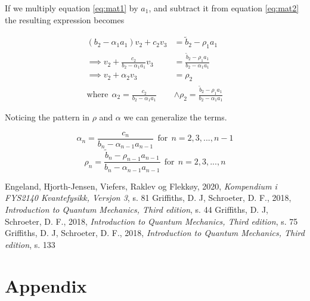 \documentclass[reprint, english,notitlepage]{revtex4-1}  %
\begin{document}
If we multiply equation \ref{eq:mat1} by $a_1$, and subtract it from equation \ref{eq:mat2} the resulting expression becomes

\begin{align*}
	(b_2 - \alpha_1 a_1) v_2 + c_2 v_3 &= \tilde{b}_2 - \rho_1 a_1 \\
	\implies v_2 + \frac{c_2}{b_2 - \alpha_1 a_1}v_3 &= \frac{\tilde{b}_2 - \rho_1 a_1}{b_2 - \alpha_1 a_1} \\
	\implies v_2 + \alpha_2 v_3 &= \rho_2 \\
	\text{where}\ \ \alpha_2 = \frac{c_2}{b_2 - \alpha_1 a_1} &\wedge \rho_2 = \frac{\tilde{b}_2 - \rho_1 a_1}{b_2 - \alpha_1 a_1}
\end{align*}

Noticing the pattern in $\rho$ and $\alpha$ we can generalize the terms.

\begin{equation}
	\alpha_n = \frac{c_n}{b_n - \alpha_{n-1}a_{n-1}} \ \ \text{for} \ \ n = 2, 3, ..., n-1
	\label{eq:alpha}
\end{equation}
\begin{equation}
	\rho_n = \frac{\tilde{b}_{n} - \rho_{n-1} a_{n-1}}{b_{n} - \alpha_{n-1} a_{n-1}}\ \ \text{for} \ \ n = 2, 3, ..., n
	\label{eq:rho}
\end{equation}


\onecolumngrid
\vspace{1cm} %
\newpage

\begin{thebibliography}{}
 Engeland, Hjorth-Jensen, Viefers, Raklev og Flekkøy,  2020, \textit{Kompendium i FYS2140 Kvantefysikk, Versjon 3}, s. 81
 Griffiths, D. J, Schroeter, D. F.,  2018, \textit{Introduction to Quantum Mechanics, Third edition}, s. 44
 Griffiths, D. J, Schroeter, D. F.,  2018, \textit{Introduction to Quantum Mechanics, Third edition}, s. 75
 Griffiths, D. J, Schroeter, D. F.,  2018, \textit{Introduction to Quantum Mechanics, Third edition}, s. 133

\end{thebibliography}

\section{Appendix}
\end{document}
